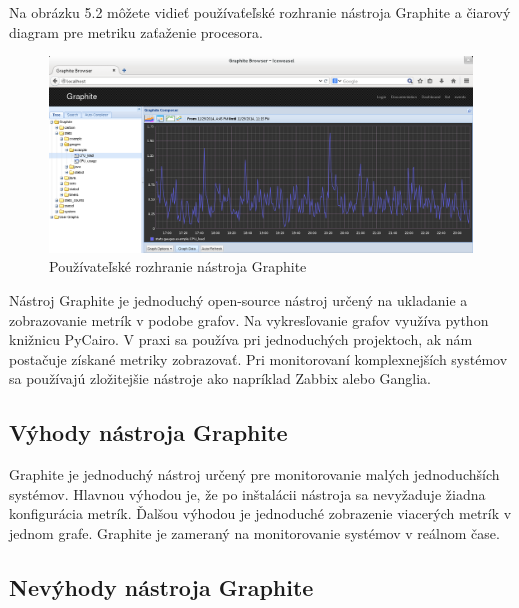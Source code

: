 \documentclass[a4paper, upjsfrontpage, disablespecwarning, thesismargins, thesislinespacing]{rnthesis}
\begin{document}
Na obrázku 5.2 môžete vidieť používaťeľské rozhranie nástroja Graphite a čiarový diagram pre metriku zaťaženie procesora.

\begin{figure}
\begin{center}
\includegraphics[scale=0.41]{graphite1.png}
\caption{Používateľské rozhranie nástroja Graphite}
\end{center}
\end{figure}

Nástroj Graphite je jednoduchý open-source nástroj určený na ukladanie a zobrazovanie metrík v podobe grafov.
Na vykresľovanie grafov využíva python knižnicu PyCairo.
V praxi sa používa pri jednoduchých projektoch, ak nám postačuje získané metriky zobrazovať.
Pri monitorovaní komplexnejších systémov sa používajú zložitejšie nástroje ako napríklad Zabbix alebo Ganglia.

\subsection{Výhody nástroja Graphite}

Graphite je jednoduchý nástroj určený pre monitorovanie malých jednoduchších systémov.
Hlavnou výhodou je, že po inštalácii nástroja sa nevyžaduje žiadna konfigurácia metrík.
Ďalšou výhodou je jednoduché zobrazenie viacerých metrík v jednom grafe.
Graphite je zameraný na monitorovanie systémov v reálnom čase.

\subsection{Nevýhody nástroja Graphite}
\end{document}
